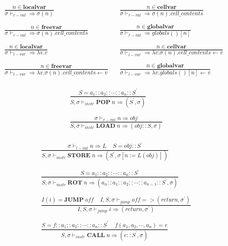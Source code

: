 \documentclass[12pt, a4paper]{report}
\newcommand{\gap}{ \;\;\;\; }
\begin{document}
\begin{equation*}
\begin{split}
\frac{n \in \mathbf{localvar}}{\sigma \vdash_{r-val} \Rightarrow \sigma(n)}
& \;\;
\frac{n \in \mathbf{cellvar}}{\sigma \vdash_{r-val} \Rightarrow \sigma(n).cell\_contents}
\;\; \\ \\
\frac{n \in \mathbf{freevar}}{\sigma \vdash_{r-val} \Rightarrow \sigma(n).cell\_contents}
& \;\;
\frac{n \in \mathbf{globalvar}}{\sigma \vdash_{r-val} \Rightarrow globals()[n]}
\\
\\
\frac{n \in \mathbf{localvar}}{\sigma \vdash_{l-var} \Rightarrow \lambda v . v}
& \;\;
\frac{n \in \mathbf{cellvar}}{\sigma \vdash_{l-var} \Rightarrow \lambda v . \sigma(n).cell\_contents \leftarrow v}
\;\; \\ \\
\frac{n \in \mathbf{freevar}}{\sigma \vdash_{l-var} \Rightarrow \lambda v . \sigma(n).cell\_contents \leftarrow v}
& \;\;
\frac{n \in \mathbf{globalvar}}{\sigma \vdash_{l-var} \Rightarrow \lambda v. globals()[n] \leftarrow v}
\end{split}
\end{equation*}


\begin{equation*}
\begin{split}
\frac{
    S = a_1 :: a_2 :: \cdots :: a_n :: S^{'}
}{
    S, \sigma \vdash_{instr} \mathbf{POP}\;n \Rightarrow (S^{'}, \sigma)
}
\\
\\
\frac{\sigma \vdash_{r-val} n \Rightarrow obj}
     {S, \sigma \vdash_{instr} \mathbf{LOAD}\; n \Rightarrow (obj :: S, \sigma)}
\end{split}
\end{equation*}

\begin{equation*}
\begin{split}
\frac{ \sigma \vdash_{l-val} n \Rightarrow L \;\;\;\; S = obj::S^{'}}
     { S, \sigma \vdash_{instr} \mathbf{STORE} \; n \Rightarrow (S^{'}, \sigma[n := L(obj)])}
\\
\\
\frac{
    S = a_1 :: a_2 :: \cdots :: a_n :: S^{'}
}{
    S, \sigma \vdash_{instr} \mathbf{ROT}\;n 
    \Rightarrow
    (a_n :: a_1 :: a_2 :: \cdots :: a_{n - 1} :: S^{'}, \sigma)
}
\\
\\
\frac{ I(i) = \mathbf{JUMP} \; \mathit{off} \;\;\;\; I, S, \sigma \vdash_{jump} \mathit{off} => (return, \sigma^{'})}
     { I, S, \sigma \vdash_{jump} i \Rightarrow (return, \sigma^{'})}
\\
\\
\frac{
    S = f :: a_1 :: a_2 :: \cdots :: a_n :: S^{'}
    \gap
    f(a_1, a_2, \cdots, a_n) = e
}{
    S, \sigma \vdash_{instr} \mathbf{CALL}\;n \Rightarrow (e::S^{'}, \sigma)
}
\end{split}
\end{equation*}
\end{document}
